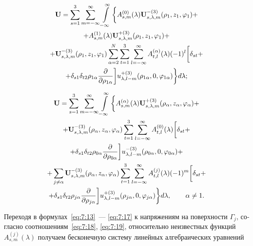 \begin{russian}
\begin{multline}
{\bf{U}} = \sum\limits_{s = 1}^3 {\sum\limits_{m =  - \infty }^\infty  {\int\limits_{ - \infty }^\infty  \bigg\{  } } A_{s,m}^{(0)}(\lambda ){\bf{U}}_{s,\lambda ,m}^{ - (3)}({\rho _1},{z_1},{\varphi _1}) + \\
+ A_{s,m}^{(1)}(\lambda ){\bf{U}}_{s,\lambda ,m}^{ + (3)}({\rho _1},{z_1},{\varphi _1}) + \\
+ {\bf{U}}_{s,\lambda ,m}^{ - (3)}({\rho _1},{z_1},{\varphi _1})\sum\limits_{\alpha  = 2}^N {\sum\limits_{t = 1}^3 {\sum\limits_{l =  - \infty }^\infty  {A_{t,l}^{(\alpha )}} } } (\lambda ){( - 1)^l}\bigg[{\delta _{st}} + \\
+ {\delta _{s1}}{\delta _{t2}}{\rho _{1\alpha }}\frac{\partial }{{\partial {\rho _{1\alpha }}}}\bigg]u_{\lambda ,l - m}^{ + (3)}({\rho _{1\alpha }},0,{\varphi _{1\alpha }})\bigg\} d\lambda;
\label{eq:7:16}
\end{multline}

\begin{multline}
{\bf{U}} = \sum\limits_{s = 1}^3 {\sum\limits_{m =  - \infty }^\infty  {\int\limits_{ - \infty }^\infty  \bigg\{  } } A_{s,m}^{(\alpha )}(\lambda ){\bf{U}}_{s,\lambda ,m}^{ + (3)}({\rho _\alpha },{z_\alpha },{\varphi _\alpha }) + \\
+ {\bf{U}}_{s,\lambda ,m}^{ - (3)}({\rho _\alpha },{z_\alpha },{\varphi _\alpha })\sum\limits_{t = 1}^3 {\sum\limits_{l =  - \infty }^\infty  {A_{t,l}^{(0)}} } (\lambda )\bigg[{\delta _{st}} + \\
+ {\delta _{s1}}{\delta _{t2}}{\rho _{0\alpha }}\frac{\partial }{{\partial {\rho _{0\alpha }}}}\bigg]u_{\lambda ,l - m}^{ - (3)}({\rho _{0\alpha }},0,{\varphi _{0\alpha }}) + \\
+ \sum\limits_{j \ne \alpha } {{\bf{U}}_{s,\lambda ,m}^{ - (3)}} ({\rho _\alpha },{z_\alpha },{\varphi _\alpha })\sum\limits_{t = 1}^3 {\sum\limits_{l =  - \infty }^\infty  {A_{t,l}^{(j)}} } (\lambda ){( - 1)^m}\bigg[{\delta _{st}} + \\
+ {\delta _{s1}}{\delta _{t2}}{\rho _{j\alpha }}\frac{\partial }{{\partial {\rho _{j\alpha }}}}\bigg]u_{\lambda ,l - m}^{ + (3)}({\rho _{j\alpha }},0,{\varphi _{j\alpha }})\bigg\} d\lambda ,\qquad {\kern 1pt} \alpha  \ne 1.
\label{eq:7:17}
\end{multline}

Переходя в формулах~\eqref{eq:7:13}~--- \eqref{eq:7:17} к напряжениям на поверхности $\Gamma_j$, согласно соотношениям~\eqref{eq:7:18}, \eqref{eq:7:19}, относительно неизвестных функций $A_{s,m}^{(j)}(\lambda)$ получаем бесконечную систему линейных алгебраических уравнений\sloppy


\end{russian}
